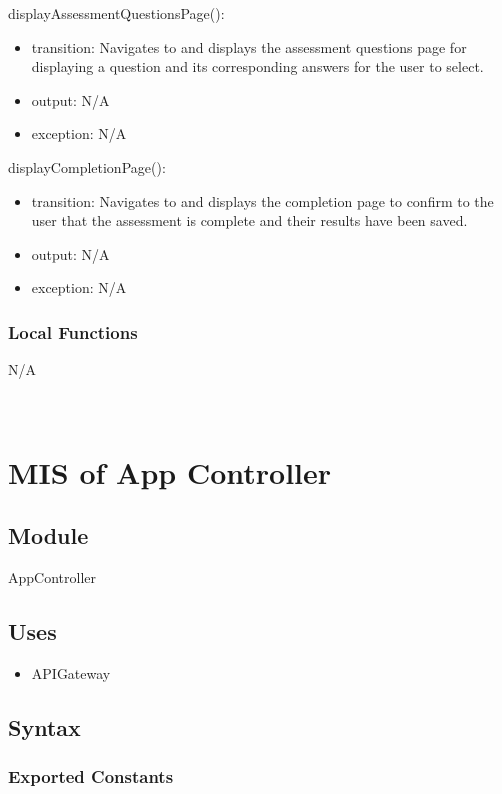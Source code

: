 \documentclass[12pt, titlepage]{article}
\begin{document}
\noindent displayAssessmentQuestionsPage():
\begin{itemize}
\item transition: Navigates to and displays the assessment questions page for displaying a question and its corresponding answers for the user to select.
\item output: N/A
\item exception: N/A
\end{itemize}

\noindent displayCompletionPage():
\begin{itemize}
\item transition: Navigates to and displays the completion page to confirm to the user that the assessment is complete and their results have been saved.
\item output: N/A
\item exception: N/A
\end{itemize}

\subsubsection{Local Functions}
N/A

~\newpage
\section{MIS of App Controller \label{mAppController} }

\subsection{Module}

AppController

\subsection{Uses}

\begin{itemize}
  \item APIGateway
\end{itemize}

\subsection{Syntax}

\subsubsection{Exported Constants}
\end{document}
